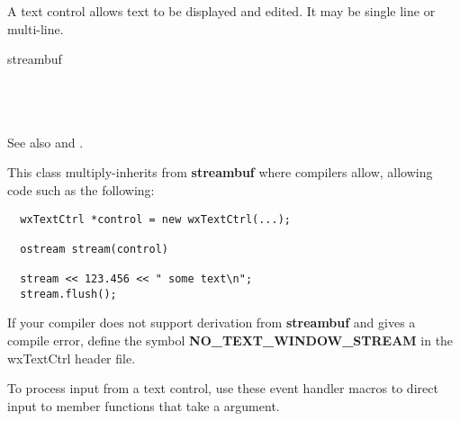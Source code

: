 \section{}\label{wxtextctrl}

A text control allows text to be displayed and edited. It may be
single line or multi-line.


streambuf\\
\\
\\
\\


\twocolwidtha{5cm}
\begin{twocollist}\itemsep=0pt
\end{twocollist}

See also  and 
.


This class multiply-inherits from {\bf streambuf} where compilers allow, allowing code such as the following:

{\small%
\begin{verbatim}
  wxTextCtrl *control = new wxTextCtrl(...);

  ostream stream(control)

  stream << 123.456 << " some text\n";
  stream.flush();
\end{verbatim}
}%

If your compiler does not support derivation from {\bf streambuf} and gives a compile error, define the symbol {\bf NO\_TEXT\_WINDOW\_STREAM} in the
wxTextCtrl header file.


To process input from a text control, use these event handler macros to direct input to member
functions that take a  argument.

